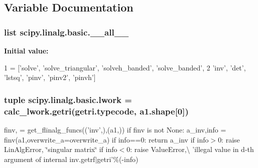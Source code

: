 \subsection{Variable Documentation}
\hypertarget{namespacescipy_1_1linalg_1_1basic_a2a856b117fbb1d565e9d987460450e60}{}
\subsubsection[{\+\_\+\+\_\+all\+\_\+\+\_\+}]{\setlength{\rightskip}{0pt plus 5cm}list scipy.\+linalg.\+basic.\+\_\+\+\_\+all\+\_\+\+\_\+}\label{namespacescipy_1_1linalg_1_1basic_a2a856b117fbb1d565e9d987460450e60}
{\bfseries Initial value\+:}
\begin{DoxyCode}
1 = [\textcolor{stringliteral}{'solve'}, \textcolor{stringliteral}{'solve\_triangular'}, \textcolor{stringliteral}{'solveh\_banded'}, \textcolor{stringliteral}{'solve\_banded'},
2             \textcolor{stringliteral}{'inv'}, \textcolor{stringliteral}{'det'}, \textcolor{stringliteral}{'lstsq'}, \textcolor{stringliteral}{'pinv'}, \textcolor{stringliteral}{'pinv2'}, \textcolor{stringliteral}{'pinvh'}]
\end{DoxyCode}
\hypertarget{namespacescipy_1_1linalg_1_1basic_af1951fa4e079ed35213a43729a2e1466}{}
\subsubsection[{lwork}]{\setlength{\rightskip}{0pt plus 5cm}tuple scipy.\+linalg.\+basic.\+lwork = {\bf calc\+\_\+lwork.\+getri}(getri.\+typecode, {\bf a1.\+shape}\mbox{[}0\mbox{]})}\label{namespacescipy_1_1linalg_1_1basic_af1951fa4e079ed35213a43729a2e1466}


finv, = get\+\_\+flinalg\+\_\+funcs(('inv',),(a1,)) if finv is not None\+: a\+\_\+inv,info = finv(a1,overwrite\+\_\+a=overwrite\+\_\+a) if info==0\+: return a\+\_\+inv if info$>$0\+: raise Lin\+Alg\+Error, \char`\"{}singular matrix\char`\"{} if info$<$0\+: raise Value\+Error,\textbackslash{} 'illegal value in d-\/th argument of internal inv.\+getrf$\vert$getri'\%(-\/info) 

